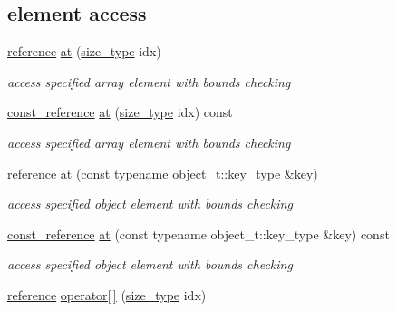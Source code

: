 \subsection*{element access}
\begin{DoxyCompactItemize}
\item 
\hyperlink{classnlohmann_1_1basic__json_a3ec8e17be8732fe436e9d6733f52b7a3}{reference} \hyperlink{classnlohmann_1_1basic__json_a214a8c22d616fd3567b88932c07436c9}{at} (\hyperlink{classnlohmann_1_1basic__json_a1579a8f72a230358d6cd1a6e8a62859b}{size\-\_\-type} idx)
\begin{DoxyCompactList}\small\item\em access specified array element with bounds checking \end{DoxyCompactList}\item 
\hyperlink{classnlohmann_1_1basic__json_af677a29b0e66edc9f66e5167e4667071}{const\-\_\-reference} \hyperlink{classnlohmann_1_1basic__json_ab31368c0b67f8e4f291a45e6498018be}{at} (\hyperlink{classnlohmann_1_1basic__json_a1579a8f72a230358d6cd1a6e8a62859b}{size\-\_\-type} idx) const 
\begin{DoxyCompactList}\small\item\em access specified array element with bounds checking \end{DoxyCompactList}\item 
\hyperlink{classnlohmann_1_1basic__json_a3ec8e17be8732fe436e9d6733f52b7a3}{reference} \hyperlink{classnlohmann_1_1basic__json_a7ed92d56cb313b243c1917696ffdf074}{at} (const typename object\-\_\-t\-::key\-\_\-type \&key)
\begin{DoxyCompactList}\small\item\em access specified object element with bounds checking \end{DoxyCompactList}\item 
\hyperlink{classnlohmann_1_1basic__json_af677a29b0e66edc9f66e5167e4667071}{const\-\_\-reference} \hyperlink{classnlohmann_1_1basic__json_a674de1ee73e6bf4843fc5dc1351fb726}{at} (const typename object\-\_\-t\-::key\-\_\-type \&key) const 
\begin{DoxyCompactList}\small\item\em access specified object element with bounds checking \end{DoxyCompactList}\item 
\hyperlink{classnlohmann_1_1basic__json_a3ec8e17be8732fe436e9d6733f52b7a3}{reference} \hyperlink{classnlohmann_1_1basic__json_a59732a1de287a7301cca19a7a7748159}{operator\mbox{[}$\,$\mbox{]}} (\hyperlink{classnlohmann_1_1basic__json_a1579a8f72a230358d6cd1a6e8a62859b}{size\-\_\-type} idx)

\end{DoxyCompactItemize}
